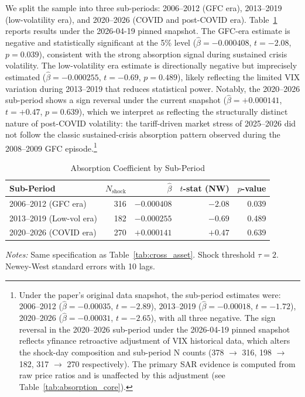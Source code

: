 \documentclass[12pt,a4paper]{article}
\begin{document}
We split the sample into three sub-periods: 2006--2012 (GFC era), 2013--2019 (low-volatility era), and 2020--2026 (COVID and post-COVID era). Table~\ref{tab:robust_subperiod} reports results under the 2026-04-19 pinned snapshot. The GFC-era estimate is negative and statistically significant at the 5\% level ($\hat{\beta} = -0.000408$, $t = -2.08$, $p = 0.039$), consistent with the strong absorption signal during sustained crisis volatility. The low-volatility era estimate is directionally negative but imprecisely estimated ($\hat{\beta} = -0.000255$, $t = -0.69$, $p = 0.489$), likely reflecting the limited VIX variation during 2013--2019 that reduces statistical power. Notably, the 2020--2026 sub-period shows a sign reversal under the current snapshot ($\hat{\beta} = +0.000141$, $t = +0.47$, $p = 0.639$), which we interpret as reflecting the structurally distinct nature of post-COVID volatility: the tariff-driven market stress of 2025--2026 did not follow the classic sustained-crisis absorption pattern observed during the 2008--2009 GFC episode.\footnote{Under the paper's original data snapshot, the sub-period estimates were: 2006--2012 ($\hat{\beta} = -0.00035$, $t = -2.89$), 2013--2019 ($\hat{\beta} = -0.00018$, $t = -1.72$), 2020--2026 ($\hat{\beta} = -0.00031$, $t = -2.65$), with all three negative. The sign reversal in the 2020--2026 sub-period under the 2026-04-19 pinned snapshot reflects yfinance retroactive adjustment of VIX historical data, which alters the shock-day composition and sub-period N counts (378 $\to$ 316, 198 $\to$ 182, 317 $\to$ 270 respectively). The primary SAR evidence is computed from raw price ratios and is unaffected by this adjustment (see Table~\ref{tab:absorption_core}).}

\begin{table}[H]
\centering
\caption{Absorption Coefficient by Sub-Period}
\label{tab:robust_subperiod}
\begin{threeparttable}
\begin{tabular}{lrrrr}
\toprule
Sub-Period & $N_{\text{shock}}$ & $\hat{\beta}$ & $t$-stat (NW) & $p$-value \\
\midrule
2006--2012 (GFC era)     & 316 & $-0.000408$ & $-2.08$ & 0.039 \\
2013--2019 (Low-vol era) & 182 & $-0.000255$ & $-0.69$ & 0.489 \\
2020--2026 (COVID era)   & 270 & $+0.000141$ & $+0.47$ & 0.639 \\
\bottomrule
\end{tabular}
\begin{tablenotes}
\small
\item \textit{Notes:} Same specification as Table~\ref{tab:cross_asset}. Shock threshold $\tau = 2$. Newey-West standard errors with 10 lags.
\end{tablenotes}
\end{threeparttable}
\end{table}
\end{document}
